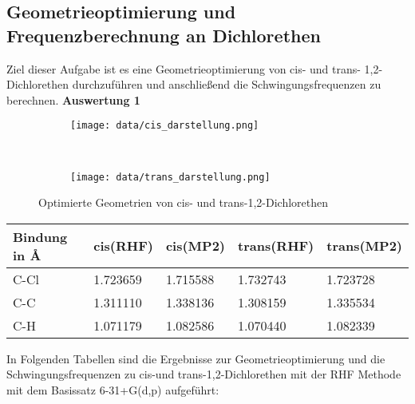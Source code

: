 \documentclass[12pt]{article}
\begin{document}
\begin{onehalfspace}

\section{Geometrieoptimierung und Frequenzberechnung an Dichlorethen}
Ziel dieser Aufgabe ist es eine Geometrieoptimierung von cis- und trans- 1,2-Dichlorethen
durchzuführen und anschließend die Schwingungsfrequenzen zu berechnen.
\textbf{Auswertung 1 }\\
\begin{figure}[!hptb]
    \centering
    \begin{subfigure}[b]{0.4\textwidth}
        \texttt{[image: data/cis\_darstellung.png]}
    \end{subfigure}
    ~ %
    \begin{subfigure}[b]{0.4\textwidth}
        \texttt{[image: data/trans\_darstellung.png]}
    \end{subfigure}
    \caption{Optimierte Geometrien von cis- und trans-1,2-Dichlorethen}
\end{figure}
\begin{table}[!htpb]
\begin{tabularx}{\textwidth}{lllll}
\toprule
Bindung in \si{\angstrom} &cis(RHF) & cis(MP2) & trans(RHF) & trans(MP2)\\
\midrule
C-Cl  & 1.723659 &1.715588   & 1.732743 & 1.723728\\
C-C  & 1.311110 & 1.338136   & 1.308159 & 1.335534\\
C-H  & 1.071179 & 1.082586   & 1.070440 & 1.082339\\
\bottomrule
\end{tabularx}
\label{tab:cistrans}
\end{table}

In Folgenden Tabellen sind die Ergebnisse zur Geometrieoptimierung und die Schwingungsfrequenzen zu cis-und trans-1,2-Dichlorethen mit der RHF Methode mit dem Basissatz 6-31+G(d,p) aufgeführt:\\
\begin{landscape}

\begin{table}[!htpb]


\end{table}
\end{landscape}
\end{onehalfspace}
\end{document}
